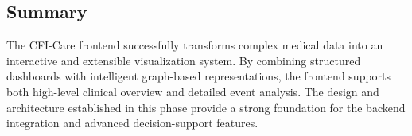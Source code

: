 \documentclass{article}
\begin{document}
\subsection{Summary}

The CFI-Care frontend successfully transforms complex medical data into an
interactive and extensible visualization system. By combining structured
dashboards with intelligent graph-based representations, the frontend supports
both high-level clinical overview and detailed event analysis. The design and
architecture established in this phase provide a strong foundation for the
backend integration and advanced decision-support features.
\end{document}
